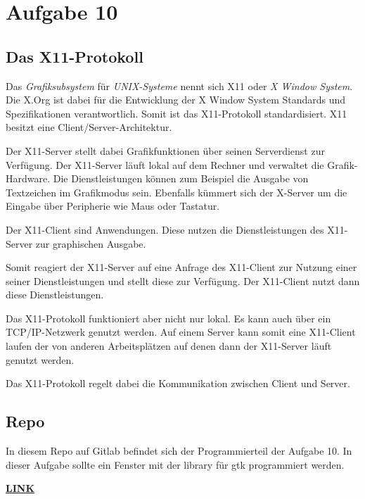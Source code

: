 \chapter{Aufgabe 10}
\section{Das X11-Protokoll}
Das \textit{Grafiksubsystem} für \textit{UNIX-Systeme} nennt sich X11 oder \textit{X Window System}.
Die X.Org ist dabei für die Entwicklung der X Window System Standards und Spezifikationen verantwortlich.
Somit ist das X11-Protokoll standardisiert.
X11 besitzt eine Client/Server-Architektur.\par
Der X11-Server stellt dabei Grafikfunktionen über seinen Serverdienst zur Verfügung.
Der X11-Server läuft lokal auf dem Rechner und verwaltet die Grafik-Hardware.
Die Dienstleistungen können zum Beispiel die Ausgabe von Textzeichen im Grafikmodus sein.
Ebenfalls kümmert sich der X-Server um die Eingabe über Peripherie wie Maus oder Tastatur.\par
Der X11-Client sind Anwendungen.
Diese nutzen die Dienstleistungen des X11-Server zur graphischen Ausgabe. \par
Somit reagiert der X11-Server auf eine Anfrage des X11-Client zur Nutzung einer seiner Dienstleistungen und stellt diese zur Verfügung.
Der X11-Client nutzt dann diese Dienstleistungen. \par
Das X11-Protokoll funktioniert aber nicht nur lokal.
Es kann auch über ein TCP/IP-Netzwerk genutzt werden.
Auf einem Server kann somit eine X11-Client laufen der von anderen Arbeitsplätzen auf denen dann der X11-Server läuft genutzt werden.\par
Das X11-Protokoll regelt dabei die Kommunikation zwischen Client und Server\cite{xwindow:2023}\cite{x11:2012}.

\section{Repo}
In diesem Repo auf Gitlab befindet sich der Programmierteil der Aufgabe 10. In dieser Aufgabe sollte ein Fenster mit der library für gtk programmiert werden.\par
\href{https://gitlab.thga.de/daniel.krueger/pruefung_sose_2023_aufgabe_10_gui}{\textbf{LINK}}
